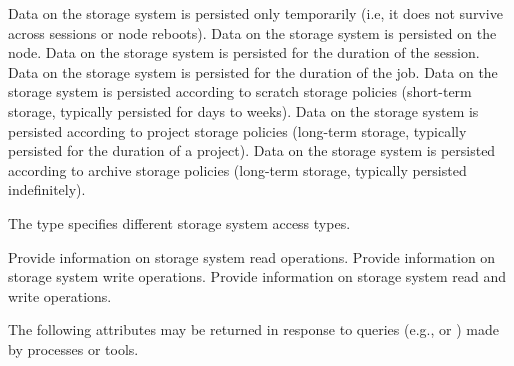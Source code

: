 \begin{constantdesc}
%
Data on the storage system is persisted only temporarily (i.e, it does not survive across sessions or node reboots).
%
Data on the storage system is persisted on the node.
%
Data on the storage system is persisted for the duration of the session.
%
Data on the storage system is persisted for the duration of the job.
%
Data on the storage system is persisted according to scratch storage policies (short-term storage, typically persisted for days to weeks).
%
Data on the storage system is persisted according to project storage policies (long-term storage, typically persisted for the duration of a project).
%
Data on the storage system is persisted according to archive storage policies (long-term storage, typically persisted indefinitely).
%
\end{constantdesc}

\provisionalMarker{}

The  type specifies different storage system access types.

\begin{constantdesc}
%
Provide information on storage system read operations.
%
Provide information on storage system write operations.
%
Provide information on storage system read and write operations.
%
\end{constantdesc}


\label{api:struct:attributes:pstrg}

The following attributes may be returned in response to queries (e.g.,  or ) made by processes or tools.

%

